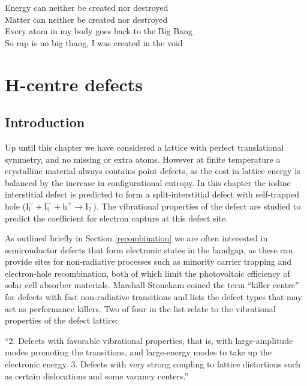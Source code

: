 \begin{savequote}[8cm]
Energy can neither be created nor destroyed \\
Matter can neither be created nor destroyed \\
Every atom in my body goes back to the Big Bang \\
So rap is no big thang, I was created in the void
\end{savequote}

\chapter{\label{ch:6-defects}H-centre defects}

\section{Introduction}

Up until this chapter we have considered a lattice with perfect translational symmetry, and no missing or extra atoms. However at finite temperature a crystalline material always contains point defects, as the cost in lattice energy is balanced by the increase in configurational entropy.
In this chapter the iodine interstitial defect is predicted to form a split-interstitial defect with self-trapped hole ($\mathrm{I}_\mathrm{i}^-+\mathrm{I}_\mathrm{i}^-+\mathrm{h}^+ \rightarrow \mathrm{I}_\mathrm{2}^-$). The vibrational properties of the defect are studied to predict the coefficient for electron capture at this defect site.

As outlined briefly in Section \ref{recombination} we are often interested in semiconductor defects that form electronic states in the bandgap, as these can provide sites for non-radiative processes such as minority carrier trapping and electron-hole recombination, both of which limit the photovoltaic efficiency of solar cell absorber materials. Marshall Stoneham coined the term ``killer centre'' for defects with fast non-radiative transitions and lists the defect types that may act as performance killers. Two of four in the list relate to the vibrational properties of the defect lattice:

\begin{displayquote}
``2. Defects with favorable vibrational properties, that is, with large-amplitude modes promoting the transitions, and large-energy modes to take up the electronic energy.
3. Defects with very strong coupling to lattice distortions such as certain dislocations and some vacancy centers.''
\end{displayquote}

